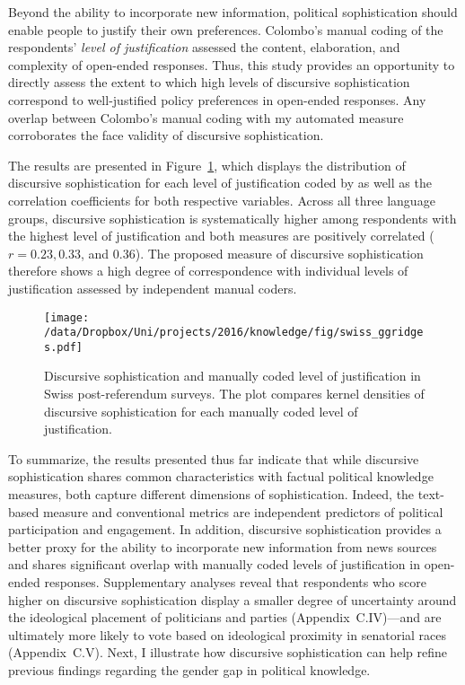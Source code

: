 Beyond the ability to incorporate new information, political sophistication should enable people to justify their own preferences. Colombo's \citeyearpar{colombo2016justifications} manual coding of the respondents' \textit{level of justification} assessed the content, elaboration, and complexity of open-ended responses. Thus, this study provides an opportunity to directly assess the extent to which high levels of discursive sophistication correspond to well-justified policy preferences in open-ended responses. Any overlap between Colombo's \citeyearpar{colombo2016justifications} manual coding with my automated measure corroborates the face validity of discursive sophistication.

The results are presented in Figure~\ref{fig:swiss_ggridges}, which displays the distribution of discursive sophistication for each level of justification coded by \citet{colombo2016justifications} as well as the correlation coefficients for both respective variables. Across all three language groups, discursive sophistication is systematically higher among respondents with the highest level of justification and both measures are positively correlated ($r=0.23, 0.33$, and $0.36$). The proposed measure of discursive sophistication therefore shows a high degree of correspondence with individual levels of justification assessed by independent manual coders.

\begin{figure}[h]\centering
\texttt{[image: /data/Dropbox/Uni/projects/2016/knowledge/fig/swiss\_ggridges.pdf]}
\caption[Discursive sophistication and manually coded level of justification in Swiss post-referendum surveys]{Discursive sophistication and manually coded level of justification \citep{colombo2016justifications} in Swiss post-referendum surveys. The plot compares kernel densities of discursive sophistication for each manually coded level of justification.}\label{fig:swiss_ggridges}
\end{figure}

To summarize, the results presented thus far indicate that while discursive sophistication shares common characteristics with factual political knowledge measures, both capture different dimensions of sophistication. Indeed, the text-based measure and conventional metrics are independent predictors of political participation and engagement. In addition, discursive sophistication provides a better proxy for the ability to incorporate new information from news sources and shares significant overlap with manually coded levels of justification in open-ended responses. Supplementary analyses reveal that respondents who score higher on discursive sophistication display a smaller degree of uncertainty around the ideological placement of politicians and parties (Appendix~C.IV)---and are ultimately more likely to vote based on ideological proximity in senatorial races (Appendix~C.V). Next, I illustrate how discursive sophistication can help refine previous findings regarding the gender gap in political knowledge.


